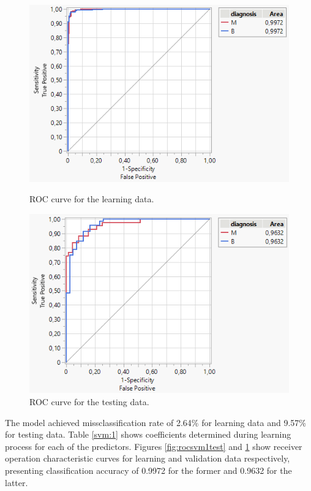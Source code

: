 \begin{figure}[!ht]
	\begin{minipage}{0.48\textwidth}
		\centering
		\includegraphics[width=0.98\linewidth]{Rysunki/Rozdzial3/roc_svm1_test}
		\caption{ROC curve for the learning data.}
		\label{fig:rocsvm1test}		
	\end{minipage}%
	\hspace{10pt}
	\begin{minipage}{0.48\textwidth}
		\centering
		\includegraphics[width=0.98\linewidth]{Rysunki/Rozdzial3/roc_svm1_val}
		\caption{ROC curve for the testing data.}
		\label{fig:rocsvm1val}				
	\end{minipage}	
\end{figure}

The model achieved missclassification rate of 2.64\% for learning data and 9.57\% for testing data. Table \ref{svm:1} shows coefficients determined during learning process for each of the predictors. Figures \ref{fig:rocsvm1test} and \ref{fig:rocsvm1val} show receiver operation characteristic curves for learning and validation data respectively, presenting classification accuracy of 0.9972 for the former and 0.9632 for the latter. 


